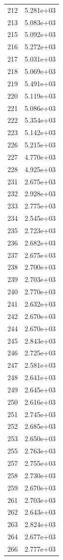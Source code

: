 \documentclass[12pt]{article}
\begin{document}
\begin{longtable}{@{}cc@{}}
212 & 5.281e+03 \\
213 & 5.083e+03 \\
215 & 5.092e+03 \\
216 & 5.272e+03 \\
217 & 5.031e+03 \\
218 & 5.069e+03 \\
219 & 5.491e+03 \\
220 & 5.119e+03 \\
221 & 5.086e+03 \\
222 & 5.354e+03 \\
223 & 5.142e+03 \\
226 & 5.215e+03 \\
227 & 4.770e+03 \\
228 & 4.925e+03 \\
231 & 2.675e+03 \\
232 & 2.928e+03 \\
233 & 2.775e+03 \\
234 & 2.545e+03 \\
235 & 2.723e+03 \\
236 & 2.682e+03 \\
237 & 2.675e+03 \\
238 & 2.700e+03 \\
239 & 2.703e+03 \\
240 & 2.770e+03 \\
241 & 2.632e+03 \\
242 & 2.670e+03 \\
244 & 2.670e+03 \\
245 & 2.843e+03 \\
246 & 2.725e+03 \\
247 & 2.581e+03 \\
248 & 2.641e+03 \\
249 & 2.645e+03 \\
250 & 2.616e+03 \\
251 & 2.745e+03 \\
252 & 2.685e+03 \\
253 & 2.650e+03 \\
255 & 2.763e+03 \\
257 & 2.755e+03 \\
258 & 2.730e+03 \\
259 & 2.670e+03 \\
261 & 2.703e+03 \\
262 & 2.643e+03 \\
263 & 2.824e+03 \\
264 & 2.677e+03 \\
266 & 2.777e+03 \\

\end{longtable}
\end{document}
